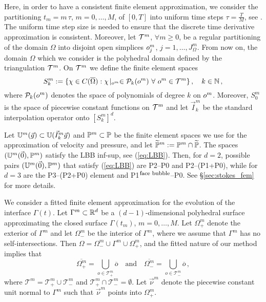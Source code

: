 Here, in order to have a consistent finite element approximation, we consider
the partitioning $t_m =m\,\tau$, $m=0,\ldots, M$, of $[0,T]$ into uniform time
steps $\tau=\frac{T}{M}$, see \cite{fluidfbp}. The uniform time step size is
needed to ensure that the discrete time derivative approximation is consistent.
Moreover, let ${\cal T}^m$, $\forall m\ge 0$, be a regular partitioning of the
domain $\Omega$ into disjoint open simplices $\sigmaO^m_j$, $j = 1 ,\ldots,
J^m_\Omega$. From now on, the domain $\Omega$ which we consider is the
polyhedral domain defined by the triangulation ${\cal T}^m$. On ${\cal T}^m$ we
define the finite element spaces
\begin{equation*}
S^m_k := \{\chi \in C(\overline{\Omega}) : \chi\!\mid_{\sigmaO^m}
\in \mathcal{P}_k(\sigmaO^m) \ \forall\ \sigmaO^m \in {\cal T}^m\}\,,
\quad k \in \mathbb{N}\,,
\end{equation*}
where $\mathcal{P}_k(\sigmaO^m)$ denotes the space of polynomials of degree $k$
on $\sigmaO^m$. Moreover, $S^m_0$ is the space of piecewise constant functions
on ${\cal T}^m$ and let $\vec I^m_k$ be the standard interpolation operator
onto $[S^m_k]^d$.

Let $\uspacedisc{g}{m}\subset\uspacesimple(\vec I_k^m\vec g)$ and
$\pspace^m\subset\pspace$ be the finite element spaces we use for the
approximation of velocity and pressure, and let $\pnormspace^m:= \pspace^m \cap
\pnormspace$. The spaces $(\uspacedisc{0}{m},\pspace^m)$ satisfy the LBB
inf-sup, see (\ref{eq:LBB}). Then, for $d=2$, possible pairs
$(\uspacedisc{0}{m},\pspace^m)$ that satisfy (\ref{eq:LBB}) are P2--P0 and
P2--(P1+P0), while for $d=3$ are the P3--(P2+P0) element and
P1$^{\mbox{\footnotesize face bubble}}$--P0. See \S\ref{sec:stokes_fem} for more
details.

We consider a fitted finite element approximation for the evolution of the
interface $\Gamma(t)$. Let $\Gamma^m\subset\R^d$ be a $(d-1)$-dimensional
polyhedral surface approximating the closed surface $\Gamma(t_m)$, $m=0
,\ldots, M$. Let $\Omega^m_+$ denote the exterior of $\Gamma^m$ and let
$\Omega^m_-$ be the interior of $\Gamma^m$, where we assume that $\Gamma^m$ has
no self-intersections. Then $\Omega = \Omega_-^m \cup \Gamma^m \cup
\Omega_+^m$, and the fitted nature of
our method implies that
\begin{equation*}
\overline{\Omega^m_+} = \bigcup_{o \in \mathcal{T}^m_+} \overline{o}
\quad\text{and}\quad
\overline{\Omega^m_-} = \bigcup_{o \in \mathcal{T}^m_-} \overline{o} \,,
\end{equation*}
where $\mathcal{T}^m = \mathcal{T}^m_+ \cup \mathcal{T}^m_-$ and
$\mathcal{T}^m_+ \cap \mathcal{T}^m_- = \emptyset$. Let $\vec \nu^m$ denote the
piecewise constant unit normal to $\Gamma^m$ such that $\vec\nu^m$ points into
$\Omega^m_+$.

